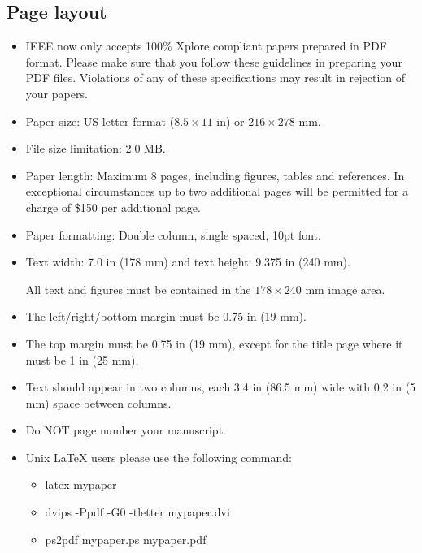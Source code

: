 \subsection{Page layout}
\begin{itemize}
\item IEEE now only accepts 100$\%$ 
	Xplore compliant papers prepared in PDF format. Please make sure that 
	you follow these guidelines in preparing 
	your PDF files. Violations of any of these specifications 
	may result in rejection of your papers.  
\item Paper size: US letter format ($8.5\times 11$ in) 
or $216\times 278$ mm.
\item File size limitation: 2.0 MB.
\item Paper length: %
Maximum 8 pages, including figures, tables and references.
In exceptional circumstances up to two additional pages will be
permitted for a charge of \$150 per additional page.
\item Paper formatting: Double column, single spaced, 10pt font.
\item Text width: 7.0 in (178 mm) and text height: 9.375 in (240 mm).

All text and figures must be contained in the $178 \times 240$ mm  image area.
\item The left/right/bottom margin must be 0.75 in (19 mm).
\item The top margin must be 0.75 in (19 mm),
 except for the title page where it must be 1 in (25 mm).
\item Text should appear in two columns, each 3.4 in (86.5 mm) wide with 0.2 in
(5 mm) space between columns.
\item Do NOT page number your manuscript.
\item Unix LaTeX users please use the following command:
\begin{itemize}
\item latex mypaper
\item dvips -Ppdf -G0 -tletter mypaper.dvi
\item ps2pdf mypaper.ps mypaper.pdf
\end{itemize}
\end{itemize}
    
